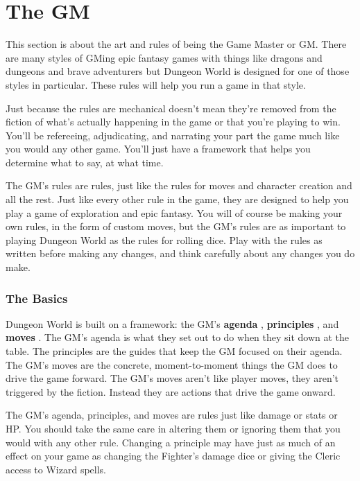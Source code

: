 \chapter{The GM}
  
 



This section is about the art and rules of being the Game Master or GM. There are many styles of GMing epic fantasy games with things like dragons and dungeons and brave adventurers but Dungeon World is designed for one of those styles in particular. These rules will help you run a game in that style.

 

Just because the rules are mechanical doesn't mean they're removed from the fiction of what's actually happening in the game or that you're playing to win. You'll be refereeing, adjudicating, and narrating your part the game much like you would any other game. You'll just have a framework that helps you determine what to say, at what time.

 

The GM's rules are rules, just like the rules for moves and character creation and all the rest. Just like every other rule in the game, they are designed to help you play a game of exploration and epic fantasy. You will of course be making your own rules, in the form of custom moves, but the GM's rules are as important to playing Dungeon World as the rules for rolling dice. Play with the rules as written before making any changes, and think carefully about any changes you do make.

 
\subsection{The Basics}   
 

Dungeon World is built on a framework: the GM's {\bf agenda} , {\bf principles} , and {\bf moves} . The GM's agenda is what they set out to do when they sit down at the table. The principles are the guides that keep the GM focused on their agenda. The GM's moves are the concrete, moment-to-moment things the GM does to drive the game forward. The GM's moves aren't like player moves, they aren't triggered by the fiction. Instead they are actions that drive the game onward.

 

The GM's agenda, principles, and moves are rules just like damage or stats or HP. You should take the same care in altering them or ignoring them that you would with any other rule. Changing a principle may have just as much of an effect on your game as changing the Fighter's damage dice or giving the Cleric access to Wizard spells.


